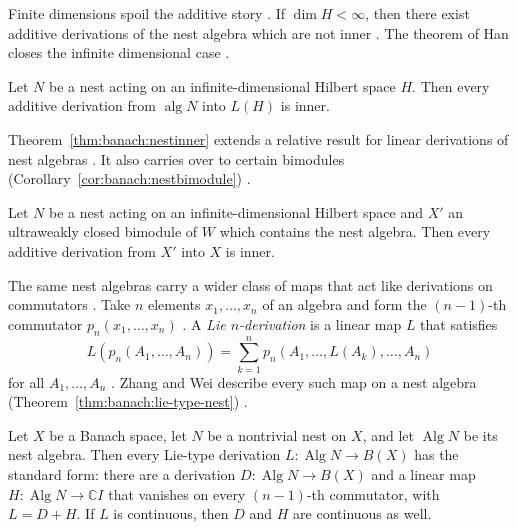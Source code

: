 Finite dimensions spoil the additive story \cite[p.~1165]{HanDeguang1993Nest}.
If $\dim H<\infty$, then there exist additive derivations of the nest algebra
which are not inner \cite[p.~1165]{HanDeguang1993Nest}. The theorem of Han
closes the infinite dimensional case \cite[Theorem~2.5,
p.~1168]{HanDeguang1993Nest}.

\begin{theorem}\label{thm:banach:nestinner}
Let $N$ be a nest acting on an infinite-dimensional Hilbert space $H$.
Then every additive derivation from $\operatorname{alg}N$ into $L(H)$ is
inner.
\end{theorem}

Theorem~\ref{thm:banach:nestinner} extends a relative result for linear
derivations of nest algebras \cite[p.~1165]{HanDeguang1993Nest}. It also
carries over to certain bimodules (Corollary~\ref{cor:banach:nestbimodule})
\cite[Corollary~2.6, p.~1169]{HanDeguang1993Nest}.\begin{corollary}\label{cor:banach:nestbimodule}
Let $N$ be a nest acting on an infinite-dimensional Hilbert space and
$X'$ an ultraweakly closed bimodule of $W$ which contains the nest
algebra. Then every additive derivation from $X'$ into $X$ is inner.
\end{corollary}

The same nest algebras carry a wider class of maps that act like derivations
on commutators \cite[p.~1]{ZhangWei2017}. Take $n$ elements $x_{1},\dots,x_{n}$ of an algebra and form
the $(n-1)$-th commutator $p_{n}(x_{1},\dots,x_{n})$
\cite[p.~1]{ZhangWei2017}. A \emph{Lie $n$-derivation} is a linear map $L$
that satisfies
\[
L(p_{n}(A_{1},\dots,A_{n}))=\sum_{k=1}^{n}p_{n}(A_{1},\dots,L(A_{k}),\dots,A_{n})
\]
for all $A_{1},\dots,A_{n}$ \cite[p.~1]{ZhangWei2017}. Zhang and Wei describe
every such map on a nest algebra (Theorem~\ref{thm:banach:lie-type-nest})
\cite[Theorem~3.1, p.~6]{ZhangWei2017}.\begin{theorem}\label{thm:banach:lie-type-nest}
Let $X$ be a Banach space, let $N$ be a nontrivial nest on $X$, and let
$\operatorname{Alg}N$ be its nest algebra. Then every Lie-type derivation
$L\colon\operatorname{Alg}N\to B(X)$ has the standard form: there are a
derivation $D\colon\operatorname{Alg}N\to B(X)$ and a linear map
$H\colon\operatorname{Alg}N\to\mathbb{C}I$ that vanishes on every
$(n-1)$-th commutator, with $L=D+H$. If $L$ is continuous, then $D$ and $H$
are continuous as well.
\end{theorem}

